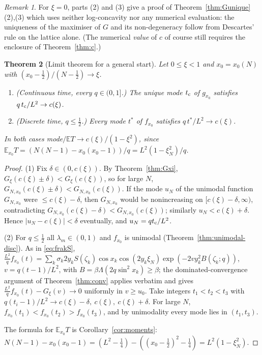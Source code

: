 \documentclass[11pt,a4paper]{article}
\newtheorem{theorem}{Theorem}[section]
\theoremstyle{definition}
\theoremstyle{remark}
\newtheorem{remark}[theorem]{Remark}
\newcommand{\E}{\mathbb{E}}
\begin{document}
\begin{remark}\label{rem:third}
For $\xi=0$, parts (2) and (3) give a proof of Theorem~\ref{thm:Gunique}(2),(3) which uses neither log-concavity nor
any numerical evaluation: the uniqueness of the maximiser of $G$ and its non-degeneracy follow from Descartes' rule on
the lattice alone. (The numerical \emph{value} of $c$ of course still requires the enclosure of Theorem~\ref{thm:c}.)
\end{remark}

\begin{theorem}[Limit theorem for a general start]\label{thm:startlimit}
Let $0\le\xi<1$ and $x_0=x_0(N)$ with $(x_0-\frac12)/(N-\frac12)\to\xi$.
\begin{enumerate}
\item (Continuous time, every $q\in(0,1]$.) The unique mode $t_{\rm c}$ of $g_{x_0}$ satisfies
 $q\,t_{\rm c}/L^2\to c(\xi)$.
\item (Discrete time, $q\le\frac12$.) Every mode $t^*$ of $f_{x_0}$ satisfies $q\,t^*/L^2\to c(\xi)$.
\end{enumerate}
In both cases mode$/\E T\to c(\xi)/(1-\xi^2)$, since $\E_{x_0}T=(N(N-1)-x_0(x_0-1))/q=L^2(1-\xi_N^2)/q$.
\end{theorem}
\begin{proof}
(1) Fix $\delta\in(0,c(\xi))$. By Theorem~\ref{thm:Gxi},
$G_\xi(c(\xi)\pm\delta)<G_\xi(c(\xi))$, so for large $N$, $G_{N,x_0}(c(\xi)\pm\delta)<G_{N,x_0}(c(\xi))$. If the mode
$u_N$ of the unimodal function $G_{N,x_0}$ were $\le c(\xi)-\delta$, then $G_{N,x_0}$ would be nonincreasing on
$[c(\xi)-\delta,\infty)$, contradicting $G_{N,x_0}(c(\xi)-\delta)<G_{N,x_0}(c(\xi))$; similarly
$u_N<c(\xi)+\delta$. Hence $|u_N-c(\xi)|<\delta$ eventually, and $u_N=qt_{\rm c}/L^2$.

(2) For $q\le\frac12$ all $\lambda_m\in(0,1)$ and $f_{x_0}$ is unimodal (Theorem~\ref{thm:unimodal-disc}). As in
\eqref{eq:frakS}, $\frac{L^2}qf_{x_0}(t)=\sum_k\sigma_k2y_kS(\zeta_k)\cos x_k\cos(2y_k\xi_N)\exp(-2vy_k^2B(\zeta_k;q))$,
$v=q(t-1)/L^2$, with $B=\beta\Lambda(2q\sin^2x_k)\ge\beta$; the dominated-convergence argument of
Theorem~\ref{thm:conv} applies verbatim and gives $\frac{L^2}qf_{x_0}(t)-G_\xi(v)\to0$ uniformly in $v\ge u_0$. Take
integers $t_1<t_2<t_3$ with $q(t_i-1)/L^2\to c(\xi)-\delta,\ c(\xi),\ c(\xi)+\delta$. For large $N$,
$f_{x_0}(t_1)<f_{x_0}(t_2)>f_{x_0}(t_3)$, and by unimodality every mode lies in $(t_1,t_3)$.

The formula for $\E_{x_0}T$ is Corollary~\ref{cor:moments}:
$N(N-1)-x_0(x_0-1)=(L^2-\frac14)-((x_0-\frac12)^2-\frac14)=L^2(1-\xi_N^2)$.
\end{proof}
\end{document}
